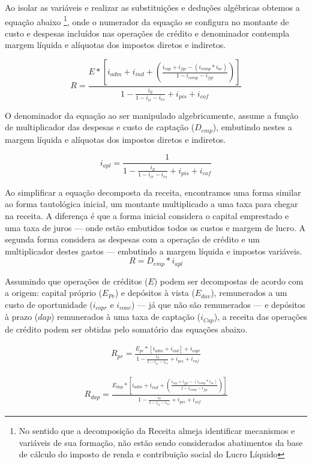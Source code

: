 \documentclass[12pt,12pt,openright,oneside,a4paper,chapter=TITLE,section=TITLE,subsection=TITLE,subsubsection=TITLE english,french,spanish,portugues,sumario=tradicional]{abntex2}
\begin{document}
Ao isolar as variáveis e realizar as substituições e deduções algébricas obtemos a equação abaixo \footnote{No sentido que a decomposição da Receita almeja identificar mecanismos e variáveis de sua formação, não estão sendo considerados abatimentos da base de cálculo do imposto de renda e contribuição social do Lucro Líquido}, onde o numerador da equação se configura no montante de custo e despesas incluídos nas operações de crédito e denominador contempla margem líquida e alíquotas dos impostos diretos e indiretos.

\[
R =  \frac{E * [i_{adm} + i_{ind} + (\frac{i_{cap}+ i_{fgc} - (i_{comp}*i_{ac})}{1 - i_{comp} - i_{fgc}})]}
{1 -  \frac{i_{ll}}{1 - i_{ir}  - i_{cs}} + i_{pis} + i_{cof}}
\]

O denominador da equação ao ser manipulado algebricamente, assume a função de multiplicador das despesas e custo de captação (\(D_{emp}\)), embutindo nestes a margem líquida e alíquotas dos impostos diretos e indiretos.

\[
i_{apl} = \frac{1}{1 -  \frac{i_{ll}}{1 - i_{ir}  - i_{cs}} + i_{pis} + i_{cof}}
\]

Ao simplificar a equação decomposta da receita, encontramos uma forma similar ao forma tautológica inicial, um montante multiplicado a uma taxa para chegar na receita. A diferença é que a forma inicial considera o capital emprestado e uma taxa de juros --- onde estão embutidos todos os custos e margem de lucro. A segunda forma considera as despesas com a operação de crédito e um multiplicador destes gastos --- embutindo a margem líquida e impostos variáveis.
\[
R = D_{emp} * i_{apl} 
\]

Assumindo que operações de créditos (\(E\)) podem ser decompostas de acordo com a origem: capital próprio (\(E_{Pr}\)) e depósitos à vista (\(E_{dav}\)), remunerados a um custo de oportunidade (\(i_{copr}\) e \(i_{coav}\)) --- já que não são remunerados --- e depósitos à prazo (\(dap\)) remunerados à uma taxa de captação (\(i_{Cap}\)), a receita das operações de crédito podem ser obtidas pelo somatório das equações abaixo.

\[\begin{aligned}
R_{pr} = \frac{E_{pr} * [i_{adm} + i_{ind}] + i_{copr}}
{1 -  \frac{i_{ll}}{1 - i_{ir} - i_{cs}} + i_{pis} + i_{cof}}
\end{aligned}\]

\[\begin{aligned}
R_{dap} = \frac{E_{dap} * [i_{adm} + i_{ind} + (\frac{i_{cap}+ i_{fgc} - (i_{comp}*i_{ac})}{1 - i_{comp} - i_{fgc}})]}  {1 -  \frac{i_{ll}}{1 - i_{ir} - i_{cs}} + i_{pis} + i_{cof}}
\end{aligned}\]
\end{document}
